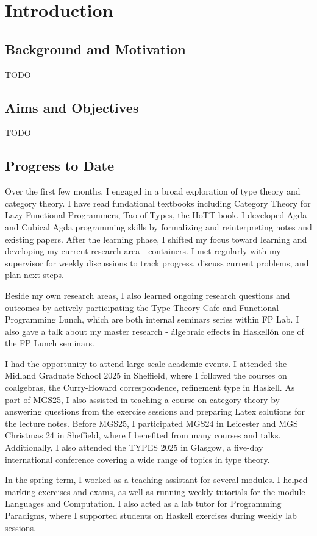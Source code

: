 \chapter{Introduction}

\section{Background and Motivation}

TODO

\section{Aims and Objectives}

TODO

\section{Progress to Date}

Over the first few months, I engaged in a broad exploration of type theory and category theory. I have read fundational textbooks including Category Theory for Lazy Functional Programmers, Tao of Types, the HoTT book. I developed Agda and Cubical Agda programming skills by formalizing and reinterpreting notes and existing papers. After the learning phase, I shifted my focus toward learning and developing my current research area - containers. I met regularly with my supervisor for weekly discussions to track progress, discuss current problems, and plan next steps.

Beside my own research areas, I also learned ongoing research questions and outcomes by actively participating the Type Theory Cafe and Functional Programming Lunch, which are both internal seminars series within FP Lab. I also gave a talk about my master research - \'algebraic effects in Haskell\' on one of the FP Lunch seminars.

I had the opportunity to attend large-scale academic events. I attended the Midland Graduate School 2025 in Sheffield, where I followed the courses on coalgebras, the Curry-Howard correspondence, refinement type in Haskell. As part of MGS25, I also assisted in teaching a course on category theory by answering questions from the exercise sessions and preparing Latex solutions for the lecture notes. Before MGS25, I participated MGS24 in Leicester and MGS Christmas 24 in Sheffield, where I benefited from many courses and talks. Additionally, I also attended the TYPES 2025 in Glasgow, a five-day international conference covering a wide range of topics in type theory.

In the spring term, I worked as a teaching assistant for several modules. I helped marking exercises and exams, as well as running weekly tutorials for the module - Languages and Computation. I also acted as a lab tutor for Programming Paradigms, where I supported students on Haskell exercises during weekly lab sessions.